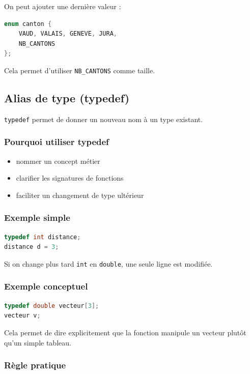 On peut ajouter une dernière valeur :

\begin{lstlisting}[language=C]
enum canton {
    VAUD, VALAIS, GENEVE, JURA,
    NB_CANTONS
};
\end{lstlisting}

Cela permet d’utiliser \texttt{NB\_CANTONS} comme taille.

\subsection{Alias de type (typedef)}

\texttt{typedef} permet de donner un nouveau nom à un type existant.

\subsubsection{Pourquoi utiliser typedef}

\begin{itemize}
    \item nommer un concept métier
    \item clarifier les signatures de fonctions
    \item faciliter un changement de type ultérieur
\end{itemize}

\subsubsection{Exemple simple}

\begin{lstlisting}[language=C]
typedef int distance;
distance d = 3;
\end{lstlisting}

Si on change plus tard \texttt{int} en \texttt{double},
une seule ligne est modifiée.

\subsubsection{Exemple conceptuel}

\begin{lstlisting}[language=C]
typedef double vecteur[3];
vecteur v;
\end{lstlisting}

Cela permet de dire explicitement que la fonction manipule
un vecteur plutôt qu’un simple tableau.

\subsubsection{Règle pratique}

